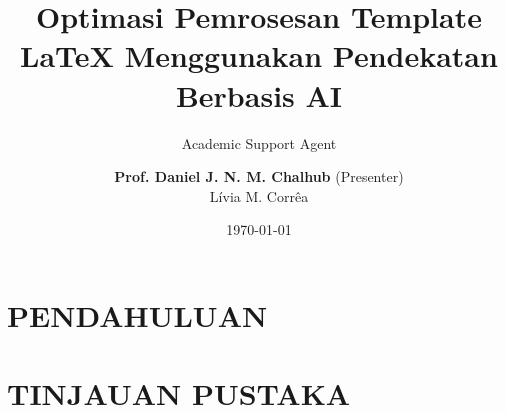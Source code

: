 \documentclass{beamer}
\title{Optimasi Pemrosesan Template LaTeX Menggunakan Pendekatan Berbasis AI}
\author{Academic Support Agent}
\date{\today}
\begin{document}
\maketitle

\begin{abstract}

\end{abstract}

\chapter{PENDAHULUAN}


\chapter{TINJAUAN PUSTAKA}



\usepackage{ragged2e} %
\usepackage{caption}
\usepackage{graphicx}
\usepackage{subfig}
\usepackage{tikz}
\usepackage{pgfplots}
\usetikzlibrary{spy,calc}
\usepackage{hyperref}
\usepackage{listings}
\usepackage{tikzpagenodes}
\usepackage{UERJpresentation}


\newcommand{\Bi}{\mathrm{Bi}}
\newcommand{\nmax}{n_{\max}}
\newcommand{\dd}{\mathrm{d}}



\newcommand{\event}{COBEM}
\newcommand{\eventdate}{December 2017}
\newcommand{\mytitle}{Template Example: Solution of the Heat Conduction in Solid-State Electronics by Integral Transforms}



\author[\scriptsize 
Prof. Daniel J. N. M. Chalhub -- daniel.chalhub@uerj.br
]
{
\textbf{Prof. Daniel J. N. M. Chalhub} (Presenter)
\\ 	
Lívia M. Corrêa
}
\end{document}
